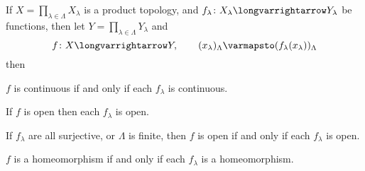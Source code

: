 \documentclass[10pt]{article}
\def\longto{\longvarrightarrow}
\begin{document}


\bigskip

\begin{prop*}

    If $X=\prod_{\lambda\in\Lambda}X_\lambda$ is a product topology, and $f_\lambda\colon X_\lambda\longto Y_\lambda$ be functions, then let $Y=\prod_{\lambda\in\Lambda}Y_\lambda$ and
    \[ f\colon X\longto Y,\qquad (x_\lambda)_\Lambda\varmapsto(f_\lambda(x_\lambda))_\Lambda \]
    then
    \benum
        \item $f$ is continuous if and only if each $f_\lambda$ is continuous.
        \item If $f$ is open then each $f_\lambda$ is open.
        \item If $f_\lambda$ are all surjective, or $\Lambda$ is finite, then $f$ is open if and only if each $f_\lambda$ is open.
        \item $f$ is a homeomorphism if and only if each $f_\lambda$ is a homeomorphism.
    \eenum

\end{prop*}
\end{document}
